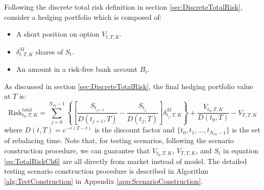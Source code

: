 \documentclass[letterpaper,12pt,titlepage,oneside,final]{book}
\numberwithin{equation}{section}
\theoremstyle{definition}
\newcommand{\DT}{\Delta t}
\newcommand{\Vmkt}{V^{mkt}}
\newcommand{\Smkt}{S}
\begin{document}
Following the discrete total risk definition in section \ref{sec:DiscreteTotalRisk}, consider a hedging portfolio  which is composed of:
\begin{itemize}
	\item A short position on option $V_{t,T,K}$.
	\item $\delta^{M}_{t,T,K}$ shares of $\Smkt_t$. 
	\item An amount in a risk-free bank account $B_t$.
\end{itemize}
As discussed in section \ref{sec:DiscreteTotalRisk}, the final hedging portfolio value at $T$ is:
\begin{equation}
\text{Risk}^{total}_{t_0,T,K}=\sum_{j=0}^{N_{rb}-1}\left\{ \left[\frac{\Smkt_{t_{j+1}}}{D(t_{j+1},T)}-\frac{\Smkt_{t_{j}}}{D(t_{j},T)}\right] \delta^M_{t_j,T,K} \right\}+\frac{V_{t_0,T,K}}{D(t_{0},T)}-V_{T,T,K}
\label{eq:TotalRiskCh6}
\end{equation}
where
$D(t,T)=e^{-r(T-t)}$ is the discount factor and $\{t_0,t_1, \dots, t_{N_{rb}-1}\}$ is the set of rebalacing time. Note that, for testing scenarios, following the scenario construction procedure, we can guarantee that $V_{t_0,T,K}$, $V_{T,T,K}$, and $\Smkt_t$ in equation \eqref{eq:TotalRiskCh6} are all directly from market instead of model. The detailed testing scenario construction procedure is described in Algorithm \ref{alg:TestConstruction} in Appendix \ref{app:ScenarioConstruction}.
\end{document}
